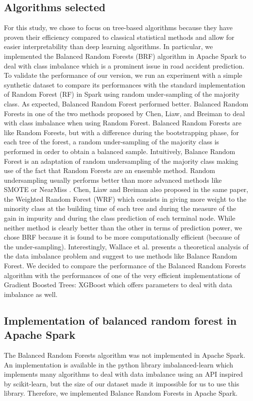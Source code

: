 \documentclass[conference]{IEEEtran}
\begin{document}
\subsection{Algorithms selected}
For this study, we chose to focus on tree-based algorithms because they have proven their efficiency compared to classical statistical methods and allow for easier interpretability than deep learning algorithms.
In particular, we implemented the Balanced Random Forests (BRF) algorithm in Apache Spark to deal with class imbalance which is a prominent issue in road accident prediction.
To validate the performance of our version, we run an experiment with a simple synthetic dataset to compare its performances with the standard implementation of Random Forest (RF) in Spark using random under-sampling of the majority class.
As expected, Balanced Random Forest performed better.
Balanced Random Forests in one of the two methods proposed by Chen, Liaw, and Breiman\cite{Chen2004} to deal with class imbalance when using Random Forest.
Balanced Random Forests are like Random Forests, but with a difference during the bootstrapping phase, for each tree of the forest, a random under-sampling of the majority class is performed in order to obtain a balanced sample.
Intuitively, Balance Random Forest is an adaptation of random undersampling of the majority class making use of the fact that Random Forests are an ensemble method.
Random undersampling usually performs better than more advanced methods like SMOTE or NearMiss \cite{Branco2016}.
Chen, Liaw and Breiman\cite{Chen2004} also proposed in the same paper, the Weighted Random Forest (WRF) which consists in giving more weight to the minority class at the building time of each tree and during the measure of the gain in impurity and during the class prediction of each terminal node.
While neither method is clearly better than the other in terms of prediction power, we chose BRF because it is found to be more computationally efficient (because of the under-sampling).
Interestingly, Wallace et al. \cite{Wallace2011} presents a theoretical analysis of the data imbalance problem and suggest to use methods like Balance Random Forest.
We decided to compare the performance of the Balanced Random Forests algorithm with the performances of one of the very efficient implementations of Gradient Boosted Trees: XGBoost which offers parameters to deal with data imbalance as well.

\subsection{Implementation of balanced random forest in Apache Spark}
The Balanced Random Forests algorithm was not implemented in Apache Spark.
An implementation is available in the python library imbalanced-learn\cite{imbalance} which implements many algorithms to deal with data imbalance using an API inspired by scikit-learn, but the size of our dataset made it impossible for us to use this library.
Therefore, we implemented Balance Random Forests in Apache Spark.
\end{document}
